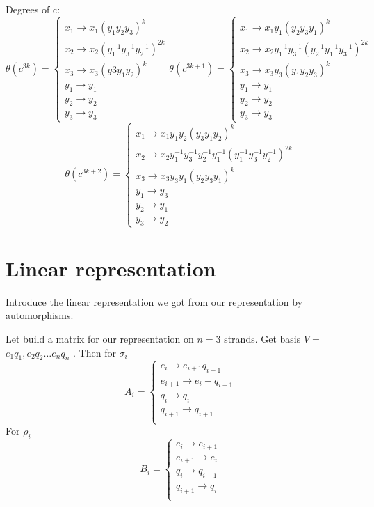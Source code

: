 \documentclass{article}
\begin{document}
Degrees of c:
$$
\theta(c^{3k}) =
\begin{cases}
	x_1 \rightarrow x_1 (y_1 y_2y_3)^{k}\\
	x_2 \rightarrow x_2 (y_1^{-1} y_3^{-1} y_2^{-1})^{2k}\\
	x_3 \rightarrow x_3 (y3 y_1 y_2)^{k}\\
	y_1 \rightarrow y_1\\
	y_2 \rightarrow y_2\\
	y_3 \rightarrow y_3
\end{cases}
\theta(c^{3k+1}) =
\begin{cases}
	x_1 \rightarrow x_1 y_1 (y_2 y_3 y_1)^{k}\\
	x_2 \rightarrow x_2 y_1^{-1} y_3^{-1}(y_2^{-1} y_1^{-1} y_3^{-1})^{2k}\\
	x_3 \rightarrow x_3 y_3 (y_1 y_2 y_3)^k\\
	y_1 \rightarrow y_1\\
	y_2 \rightarrow y_2\\
	y_3 \rightarrow y_3
\end{cases} 
$$
$$
\theta(c^{3k+2}) =
\begin{cases}
	x_1 \rightarrow x_1 y_1 y_2 (y_3 y_1 y_2)^{k} \\
	x_2 \rightarrow x_2 y_1^{-1} y_3^{-1} y_2^{-1} y_1^{-1} (y_1^{-1} y_3^{-1} y_2^{-1})^{2k}\\
	x_3 \rightarrow x_3 y_3 y_1 (y_2 y_3 y_1)^k\\
	y_1 \rightarrow y_3\\
	y_2 \rightarrow y_1\\
	y_3 \rightarrow y_2
\end{cases}
$$
\section{Linear representation}
Introduce the linear representation we got from our representation by automorphisms.

Let build a matrix for our representation on $n=3$ strands. Get basis $V = $ { $e_1 q_1,e_2 q_2  \dots e_n q_n$ }. Then for $\sigma_i$ 
$$
A_i = 
\begin{cases}
	e_i \rightarrow e_{i+1}q_{i+1}\\
	e_{i+1}\rightarrow  e_i-q_{i+1}\\
	q_i\rightarrow  q_i\\
	q_{i+1}\rightarrow  q_{i+1}\\
\end{cases}
$$
For $\rho_i$ 
$$
B_i = 
\begin{cases}
	e_i\rightarrow e_{i+1}\\
	e_{i+1}\rightarrow e_i\\
	q_i\rightarrow q_{i+1}\\
	q_{i+1}\rightarrow q_i\\
\end{cases}
$$
\end{document}
